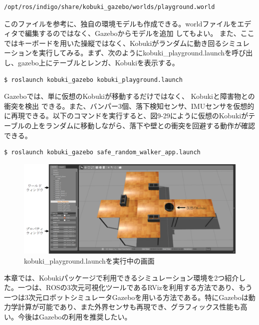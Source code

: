 \begin{itemize}
\begin{lstlisting}[language=ROS]
/opt/ros/indigo/share/kobuki_gazebo/worlds/playground.world
\end{lstlisting}

このファイルを参考に、独自の環境モデルも作成できる。worldファイルをエディタで編集するのではなく、Gazeboからモデルを追加  してもよい。
また、ここではキーボードを用いた操縦ではなく、Kobukiがランダムに動き回るシミュレーションを実行してみる。まず、次のようにkobuki\_playground.launchを呼び出し、gazebo上にテーブルとレンガ、Kobukiを表示する。

\begin{lstlisting}[language=ROS]
$ roslaunch kobuki_gazebo kobuki_playground.launch
\end{lstlisting}

Gazeboでは、単に仮想のKobukiが移動するだけではなく、  Kobukiと障害物との衝突を検出  できる。また、バンパー3個、落下検知センサ、IMUセンサを仮想的に再現できる。以下のコマンドを実行すると、図9-29にように仮想のKobukiがテーブルの上をランダムに移動しながら、落下や壁との衝突を回避する動作が確認できる。

\begin{lstlisting}[language=ROS]
$ roslaunch kobuki_gazebo safe_random_walker_app.launch
\end{lstlisting}

\begin{figure}[htp]
  \centering
  \includegraphics[width=\columnwidth]{pictures/chapter9/pic_09_29.png}
  \caption{kobuki\_playground.launchを実行中の画面}
\end{figure}


本章では、Kobukiパッケージで利用できるシミュレーション環境を2つ紹介した。一つは、ROSの3次元可視化ツールであるRVizを利用する方法であり、もう一つは3次元ロボットシミュレータGazeboを用いる方法である。特にGazeboは動力学計算が可能であり、また外界センサも再現でき、グラフィックス性能も高い。今後はGazeboの利用を推奨したい。


\end{itemize}

